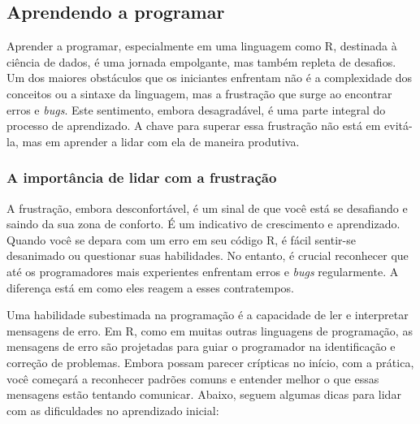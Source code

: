 \documentclass[
]{book}
\begin{document}
\subsection{Aprendendo a programar}\label{aprendendo-a-programar}

Aprender a programar, especialmente em uma linguagem como R, destinada à ciência de dados, é uma jornada empolgante, mas também repleta de desafios. Um dos maiores obstáculos que os iniciantes enfrentam não é a complexidade dos conceitos ou a sintaxe da linguagem, mas a frustração que surge ao encontrar erros e \emph{bugs}. Este sentimento, embora desagradável, é uma parte integral do processo de aprendizado. A chave para superar essa frustração não está em evitá-la, mas em aprender a lidar com ela de maneira produtiva.

\subsubsection{A importância de lidar com a frustração}\label{a-importuxe2ncia-de-lidar-com-a-frustrauxe7uxe3o}

A frustração, embora desconfortável, é um sinal de que você está se desafiando e saindo da sua zona de conforto. É um indicativo de crescimento e aprendizado. Quando você se depara com um erro em seu código R, é fácil sentir-se desanimado ou questionar suas habilidades. No entanto, é crucial reconhecer que até os programadores mais experientes enfrentam erros e \emph{bugs} regularmente. A diferença está em como eles reagem a esses contratempos.

Uma habilidade subestimada na programação é a capacidade de ler e interpretar mensagens de erro. Em R, como em muitas outras linguagens de programação, as mensagens de erro são projetadas para guiar o programador na identificação e correção de problemas. Embora possam parecer crípticas no início, com a prática, você começará a reconhecer padrões comuns e entender melhor o que essas mensagens estão tentando comunicar. Abaixo, seguem algumas dicas para lidar com as dificuldades no aprendizado inicial:
\end{document}
